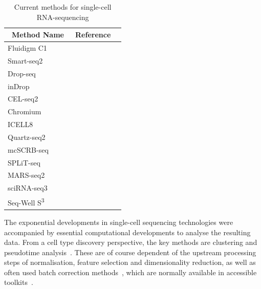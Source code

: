 \begin{table}[ht!] %
\footnotesize
\caption[Current methods for single-cell RNA-seq]{Current methods for single-cell RNA-sequencing}
\centering
\label{table:tab_1_1}
\begin{tabular}{l|l|c}
\toprule
~\textbf{Method Name} & ~\textbf{Reference}  \\
\midrule
Fluidigm C1 & ~\citep{brennecke_accounting_2013}  \\

Smart-seq2 & ~\citep{picelli_full-length_2014}  \\

Drop-seq & ~\citep{macosko_highly_2015}  \\

inDrop & ~\citep{klein_droplet_2015}  \\

CEL-seq2 & ~\citep{hashimshony_cel-seq2:_2016}  \\

Chromium & ~\citep{zheng_massively_2017}  \\

ICELL8 & ~\citep{goldstein_massively_2017}  \\

Quartz-seq2 & ~\citep{sasagawa_quartz-seq2:_2018}  \\

mcSCRB-seq & ~\citep{bagnoli_sensitive_2018}  \\

SPLiT-seq & ~\citep{rosenberg_single-cell_2018}  \\

MARS-seq2 & ~\citep{keren-shaul_mars-seq2.0:_2019}  \\

sciRNA-seq3 & ~\citep{cao_single-cell_2019}  \\

Seq-Well S\textsuperscript{3} & ~\citep{hughes_highly_2019}  \\

\bottomrule
\end{tabular}
\end{table}

The exponential developments in single-cell sequencing technologies were accompanied by essential computational developments to analyse the resulting data. From a cell type discovery perspective, the key methods are clustering and pseudotime analysis~\citep{rostom_computational_2017}. These are of course dependent of the upstream processing steps of normalisation, feature selection and dimensionality reduction, as well as often used batch correction methods~\citep{luecken_current_2019}, which are normally available in accessible toolkits~\citep{mccarthy_scater:_2017,butler_integrating_2018,wolf_scanpy:_2018}.

